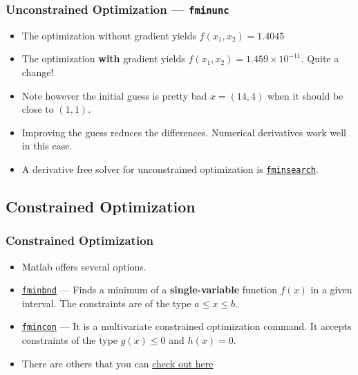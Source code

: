 \documentclass[11pt,xcolor={svgnames},aspectratio=169,usepdftitle=false]{beamer}
\begin{document}
\begin{frame}[fragile]
  \frametitle{Unconstrained Optimization --- \texttt{fminunc}}
  \begin{itemize}
    \item The optimization without gradient yields $f(x_1,x_2) = 1.4045$
    \item The optimization \alert{\textbf{with}} gradient yields $f(x_1,x_2) = 1.459\times 10^{-11}$. Quite a change!
    \item Note however the initial guess is pretty bad $x = (14, 4)$ when it should be close to $(1,1)$.
    \item Improving the guess reduces the differences. Numerical derivatives work well in this case.
    \item A derivative free solver for unconstrained optimization is \href{https://www.mathworks.com/help/matlab/ref/fminsearch.html}{\texttt{fminsearch}}.
  \end{itemize}
\end{frame}

\subsection{Constrained Optimization}

\begin{frame}
  \frametitle{Constrained Optimization}
\begin{itemize}
  \item Matlab offers several options.
  \item \href{https://www.mathworks.com/help/matlab/ref/fminbnd.html?s_tid=doc_ta}{\texttt{fminbnd}} --- Finds a minimum of a \alert{\textbf{single-variable}} function $f(x)$ in a given interval. The constraints are of the type $a\leq x \leq b$.
  \item \href{https://www.mathworks.com/help/optim/ug/fmincon.html}{\texttt{fmincon}} --- It is a multivariate constrained optimization command. It accepts constraints of the type $g(x)\leq 0$ and $h(x) = 0$. 
  \item There are others that you can \href{https://www.mathworks.com/help/optim/ug/problems-handled-by-optimization-toolbox-functions.html\#tblminprobs}{check out here}
\end{itemize}
\end{frame}
\end{document}
